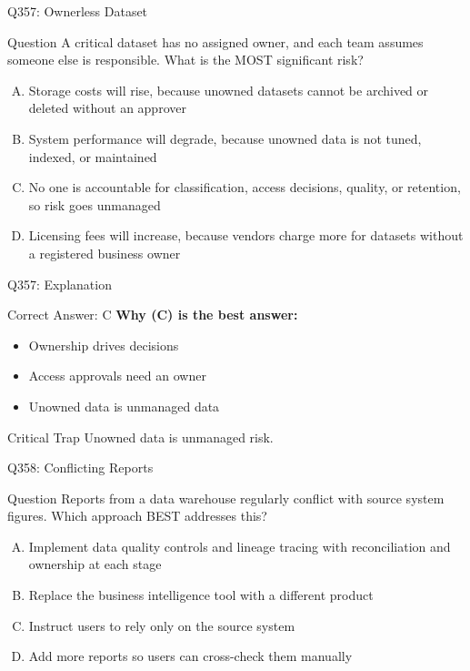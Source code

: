 \documentclass{beamer}
\begin{document}
	\begin{frame}{Q357: Ownerless Dataset}
		\begin{block}{Question}
			\small A critical dataset has no assigned owner, and each team assumes someone else is responsible. What is the MOST significant risk?
		\end{block}
		\begin{enumerate}[(A)]
			\footnotesize
			\item Storage costs will rise, because unowned datasets cannot be archived or deleted without an approver
			\item System performance will degrade, because unowned data is not tuned, indexed, or maintained
			\item No one is accountable for classification, access decisions, quality, or retention, so risk goes unmanaged
			\item Licensing fees will increase, because vendors charge more for datasets without a registered business owner
		\end{enumerate}
	\end{frame}
	
	\begin{frame}{Q357: Explanation}
		\begin{block}{Correct Answer: C}
			\textbf{Why (C) is the best answer:}
			\begin{itemize}
				\item Ownership drives decisions
				\item Access approvals need an owner
				\item Unowned data is unmanaged data
			\end{itemize}
		\end{block}
		\begin{alertblock}{Critical Trap}
			Unowned data is unmanaged risk.
		\end{alertblock}
	\end{frame}
	
	\begin{frame}{Q358: Conflicting Reports}
		\begin{block}{Question}
			\small Reports from a data warehouse regularly conflict with source system figures. Which approach BEST addresses this?
		\end{block}
		\begin{enumerate}[(A)]
			\footnotesize
			\item Implement data quality controls and lineage tracing with reconciliation and ownership at each stage
			\item Replace the business intelligence tool with a different product
			\item Instruct users to rely only on the source system
			\item Add more reports so users can cross-check them manually
		\end{enumerate}
	\end{frame}
	
\end{document}
